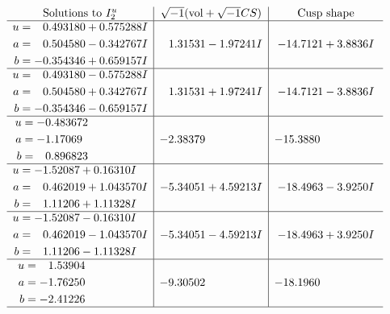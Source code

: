 \documentclass[1p]{elsarticle_modified}
\theoremstyle{definition}
\newcommand{\I}{\sqrt{-1}}
\begin{document}
$$\begin{array}{c|c|c}  
\text{Solutions to }I^u_{2}& \I (\text{vol} + \sqrt{-1}CS) & \text{Cusp shape}\\
 \hline 
\begin{aligned}
u &= \phantom{-}0.493180 + 0.575288 I \\
a &= \phantom{-}0.504580 - 0.342767 I \\
b &= -0.354346 + 0.659157 I\end{aligned}
 & \phantom{-}1.31531 - 1.97241 I & -14.7121 + 3.8836 I \\ \hline\begin{aligned}
u &= \phantom{-}0.493180 - 0.575288 I \\
a &= \phantom{-}0.504580 + 0.342767 I \\
b &= -0.354346 - 0.659157 I\end{aligned}
 & \phantom{-}1.31531 + 1.97241 I & -14.7121 - 3.8836 I \\ \hline\begin{aligned}
u &= -0.483672\phantom{ +0.000000I} \\
a &= -1.17069\phantom{ +0.000000I} \\
b &= \phantom{-}0.896823\phantom{ +0.000000I}\end{aligned}
 & -2.38379\phantom{ +0.000000I} & -15.3880\phantom{ +0.000000I} \\ \hline\begin{aligned}
u &= -1.52087 + 0.16310 I \\
a &= \phantom{-}0.462019 + 1.043570 I \\
b &= \phantom{-}1.11206 + 1.11328 I\end{aligned}
 & -5.34051 + 4.59213 I & -18.4963 - 3.9250 I \\ \hline\begin{aligned}
u &= -1.52087 - 0.16310 I \\
a &= \phantom{-}0.462019 - 1.043570 I \\
b &= \phantom{-}1.11206 - 1.11328 I\end{aligned}
 & -5.34051 - 4.59213 I & -18.4963 + 3.9250 I \\ \hline\begin{aligned}
u &= \phantom{-}1.53904\phantom{ +0.000000I} \\
a &= -1.76250\phantom{ +0.000000I} \\
b &= -2.41226\phantom{ +0.000000I}\end{aligned}
 & -9.30502\phantom{ +0.000000I} & -18.1960\phantom{ +0.000000I}\\
 \hline 
 \end{array}$$\newpage
\end{document}
